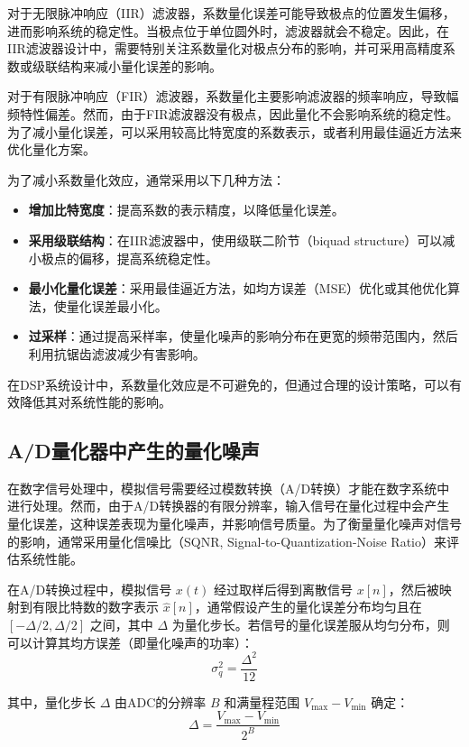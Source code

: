 \documentclass[lang=cn,newtx,10pt,scheme=chinese]{elegantbook}
\begin{document}
对于无限脉冲响应（IIR）滤波器，系数量化误差可能导致极点的位置发生偏移，进而影响系统的稳定性。当极点位于单位圆外时，滤波器就会不稳定。因此，在IIR滤波器设计中，需要特别关注系数量化对极点分布的影响，并可采用高精度系数或级联结构来减小量化误差的影响。


对于有限脉冲响应（FIR）滤波器，系数量化主要影响滤波器的频率响应，导致幅频特性偏差。然而，由于FIR滤波器没有极点，因此量化不会影响系统的稳定性。为了减小量化误差，可以采用较高比特宽度的系数表示，或者利用最佳逼近方法来优化量化方案。

为了减小系数量化效应，通常采用以下几种方法：
\begin{itemize}
    \item \textbf{增加比特宽度}：提高系数的表示精度，以降低量化误差。
    \item \textbf{采用级联结构}：在IIR滤波器中，使用级联二阶节（biquad structure）可以减小极点的偏移，提高系统稳定性。
    \item \textbf{最小化量化误差}：采用最佳逼近方法，如均方误差（MSE）优化或其他优化算法，使量化误差最小化。
    \item \textbf{过采样}：通过提高采样率，使量化噪声的影响分布在更宽的频带范围内，然后利用抗锯齿滤波减少有害影响。
\end{itemize}

在DSP系统设计中，系数量化效应是不可避免的，但通过合理的设计策略，可以有效降低其对系统性能的影响。
\subsection{A/D量化器中产生的量化噪声}
在数字信号处理中，模拟信号需要经过模数转换（A/D转换）才能在数字系统中进行处理。然而，由于A/D转换器的有限分辨率，输入信号在量化过程中会产生量化误差，这种误差表现为量化噪声，并影响信号质量。为了衡量量化噪声对信号的影响，通常采用量化信噪比（SQNR, Signal-to-Quantization-Noise Ratio）来评估系统性能。


在A/D转换过程中，模拟信号 \( x(t) \) 经过取样后得到离散信号 \( x[n] \)，然后被映射到有限比特数的数字表示 \( \hat{x}[n] \)，通常假设产生的量化误差分布均匀且在\([- \Delta /2, \Delta /2]\) 之间，其中 \( \Delta \) 为量化步长。若信号的量化误差服从均匀分布，则可以计算其均方误差（即量化噪声的功率）：
\begin{equation}
  \sigma_q^2 = \frac{\Delta^2}{12}
\end{equation}


其中，量化步长 \( \Delta \) 由ADC的分辨率 \( B \) 和满量程范围 \( V_{\max} - V_{\min} \) 确定：
\begin{equation}
  \Delta = \frac{V_{\max} - V_{\min}}{2^B}
\end{equation}
\end{document}
